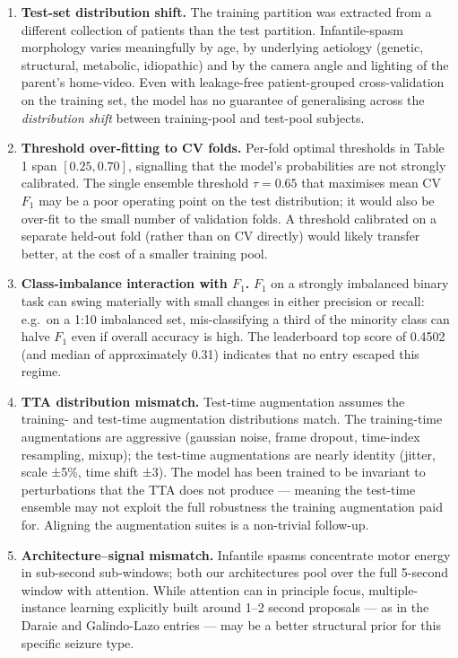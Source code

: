 \documentclass[
  11pt,
]{article}
\providecommand{\tightlist}{%
  \setlength{\itemsep}{0pt}\setlength{\parskip}{0pt}}
\begin{document}
\begin{enumerate}
\def\labelenumi{\arabic{enumi}.}
\tightlist
\item
  \textbf{Test-set distribution shift.} The training partition was
  extracted from a different collection of patients than the test
  partition. Infantile-spasm morphology varies meaningfully by age, by
  underlying aetiology (genetic, structural, metabolic, idiopathic) and
  by the camera angle and lighting of the parent's home-video. Even with
  leakage-free patient-grouped cross-validation on the training set, the
  model has no guarantee of generalising across the \emph{distribution
  shift} between training-pool and test-pool subjects.
\item
  \textbf{Threshold over-fitting to CV folds.} Per-fold optimal
  thresholds in Table 1 span \([0.25, 0.70]\), signalling that the
  model's probabilities are not strongly calibrated. The single ensemble
  threshold \(\tau = 0.65\) that maximises mean CV \(F_1\) may be a poor
  operating point on the test distribution; it would also be over-fit to
  the small number of validation folds. A threshold calibrated on a
  separate held-out fold (rather than on CV directly) would likely
  transfer better, at the cost of a smaller training pool.
\item
  \textbf{Class-imbalance interaction with \(F_1\).} \(F_1\) on a
  strongly imbalanced binary task can swing materially with small
  changes in either precision or recall: e.g.~on a 1:10 imbalanced set,
  mis-classifying a third of the minority class can halve \(F_1\) even
  if overall accuracy is high. The leaderboard top score of 0.4502 (and
  median of approximately 0.31) indicates that no entry escaped this
  regime.
\item
  \textbf{TTA distribution mismatch.} Test-time augmentation assumes the
  training- and test-time augmentation distributions match. The
  training-time augmentations are aggressive (gaussian noise, frame
  dropout, time-index resampling, mixup); the test-time augmentations
  are nearly identity (jitter, scale ±5\%, time shift ±3). The model has
  been trained to be invariant to perturbations that the TTA does not
  produce --- meaning the test-time ensemble may not exploit the full
  robustness the training augmentation paid for. Aligning the
  augmentation suites is a non-trivial follow-up.
\item
  \textbf{Architecture--signal mismatch.} Infantile spasms concentrate
  motor energy in sub-second sub-windows; both our architectures pool
  over the full 5-second window with attention. While attention can in
  principle focus, multiple-instance learning explicitly built around
  1--2 second proposals --- as in the Daraie and Galindo-Lazo entries
  --- may be a better structural prior for this specific seizure type.
\end{enumerate}
\end{document}
